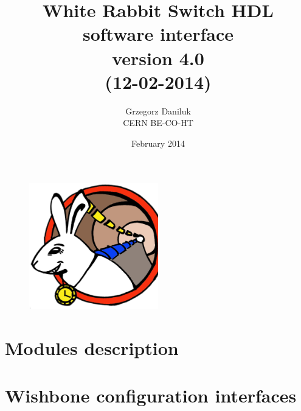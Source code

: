 \documentclass[a4paper, 12pt]{article}
\begin{document}
\title{White Rabbit Switch HDL\\ software interface\\\normalsize
{version 4.0}\\\small{(12-02-2014)}}
\author{Grzegorz Daniluk\\ CERN BE-CO-HT}

\date{February 2014}
\maketitle
\thispagestyle{empty}

\begin{figure}[ht!]
  \centering
  \vspace{1.3cm}
  \includegraphics[width=0.50\textwidth]{../../../../figures/logo/WRlogo.ps}
  \label{fig:wr_logo}
\end{figure}

\newpage

\newpage

\newpage

\tableofcontents

\newpage



\section{Modules description}














\newpage
\section{Wishbone configuration interfaces}

\newpage

\newpage


\newpage

\newpage

\newpage

\newpage

\newpage

\newpage

\newpage

\newpage

\newpage

\newpage

\newpage

\end{document}

